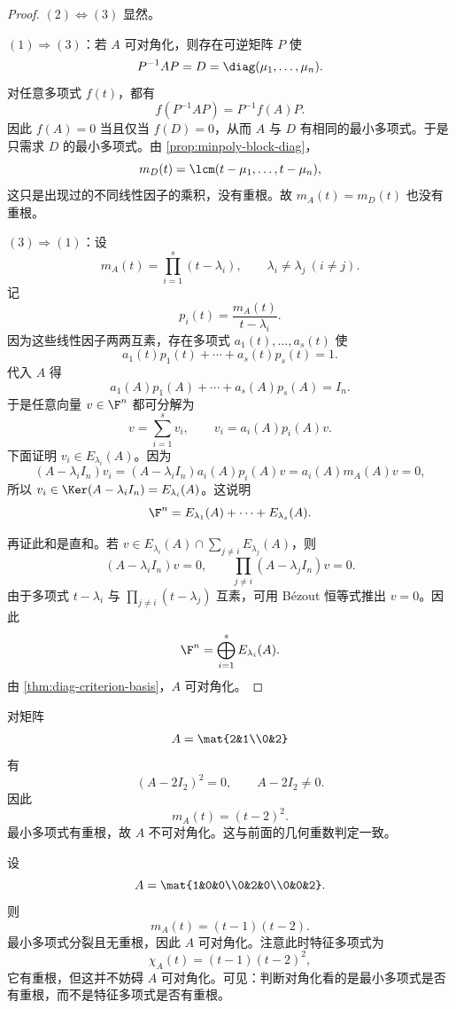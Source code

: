 \begin{proof}
\((2)\Leftrightarrow(3)\) 显然。

\((1)\Rightarrow(3)\)：若 \(A\) 可对角化，则存在可逆矩阵 \(P\) 使
\[
P^{-1}AP=D=\diag(\mu_1,\dots,\mu_n).
\]
对任意多项式 \(f(t)\)，都有
\[
f(P^{-1}AP)=P^{-1}f(A)P.
\]
因此 \(f(A)=0\) 当且仅当 \(f(D)=0\)，从而 \(A\) 与 \(D\) 有相同的最小多项式。于是只需求 \(D\) 的最小多项式。由 \cref{prop:minpoly-block-diag}，
\[
m_D(t)=\lcm(t-\mu_1,\dots,t-\mu_n),
\]
这只是出现过的不同线性因子的乘积，没有重根。故 \(m_A(t)=m_D(t)\) 也没有重根。

\((3)\Rightarrow(1)\)：设
\[
m_A(t)=\prod_{i=1}^s (t-\lambda_i),
\qquad \lambda_i\neq \lambda_j\ (i\neq j).
\]
记
\[
p_i(t)=\frac{m_A(t)}{t-\lambda_i}.
\]
因为这些线性因子两两互素，存在多项式 \(a_1(t),\dots,a_s(t)\) 使
\[
a_1(t)p_1(t)+\cdots+a_s(t)p_s(t)=1.
\]
代入 \(A\) 得
\[
a_1(A)p_1(A)+\cdots+a_s(A)p_s(A)=I_n.
\]
于是任意向量 \(v\in \F^n\) 都可分解为
\[
v=\sum_{i=1}^s v_i,
\qquad v_i=a_i(A)p_i(A)v.
\]
下面证明 \(v_i\in E_{\lambda_i}(A)\)。因为
\[
(A-\lambda_i I_n)v_i=(A-\lambda_i I_n)a_i(A)p_i(A)v=a_i(A)m_A(A)v=0,
\]
所以 \(v_i\in \Ker(A-\lambda_i I_n)=E_{\lambda_i}(A)\)。这说明
\[
\F^n=E_{\lambda_1}(A)+\cdots+E_{\lambda_s}(A).
\]

再证此和是直和。若 \(v\in E_{\lambda_i}(A)\cap \sum_{j\ne i}E_{\lambda_j}(A)\)，则
\[
(A-\lambda_i I_n)v=0,
\qquad \prod_{j\ne i}(A-\lambda_j I_n)v=0.
\]
由于多项式 \(t-\lambda_i\) 与 \(\prod_{j\ne i}(t-\lambda_j)\) 互素，可用 Bézout 恒等式推出 \(v=0\)。因此
\[
\F^n=\bigoplus_{i=1}^s E_{\lambda_i}(A).
\]
由 \cref{thm:diag-criterion-basis}，\(A\) 可对角化。
\end{proof}

\begin{example}
对矩阵
\[
A=\mat{2&1\\0&2}
\]
有
\[
(A-2I_2)^2=0,
\qquad A-2I_2\neq 0.
\]
因此
\[
m_A(t)=(t-2)^2.
\]
最小多项式有重根，故 \(A\) 不可对角化。这与前面的几何重数判定一致。
\end{example}

\begin{example}
设
\[
A=\mat{1&0&0\\0&2&0\\0&0&2}.
\]
则
\[
m_A(t)=(t-1)(t-2).
\]
最小多项式分裂且无重根，因此 \(A\) 可对角化。注意此时特征多项式为
\[
\chi_A(t)=(t-1)(t-2)^2,
\]
它有重根，但这并不妨碍 \(A\) 可对角化。可见：判断对角化看的是最小多项式是否有重根，而不是特征多项式是否有重根。
\end{example}


